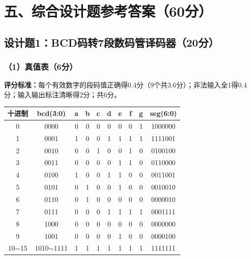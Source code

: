 \newpage

\section{五、综合设计题参考答案（60分）}

\subsection{设计题1：BCD码转7段数码管译码器（20分）}

\subsubsection{（1）真值表（6分）}

\begin{framed}
\textbf{评分标准：}每个有效数字的段码值正确得0.4分（9个共3.6分）；非法输入全1得0.4分；输入输出标注清晰得2分；共6分。
\end{framed}

\vspace{0.3cm}
\begin{center}
\begin{tabular}{|c|c|c|c|c|c|c|c|c|c|}
\hline
\textbf{十进制} & \textbf{bcd(3:0)} & \textbf{a} & \textbf{b} & \textbf{c} & \textbf{d} & \textbf{e} & \textbf{f} & \textbf{g} & \textbf{seg(6:0)} \\
\hline
0 & 0000 & 0 & 0 & 0 & 0 & 0 & 0 & 1 & 1000000 \\
1 & 0001 & 1 & 0 & 0 & 1 & 1 & 1 & 1 & 1111001 \\
2 & 0010 & 0 & 0 & 1 & 0 & 0 & 1 & 0 & 0100100 \\
3 & 0011 & 0 & 0 & 0 & 0 & 1 & 1 & 0 & 0110000 \\
4 & 0100 & 1 & 0 & 0 & 1 & 1 & 0 & 0 & 0011001 \\
5 & 0101 & 0 & 1 & 0 & 0 & 1 & 0 & 0 & 0010010 \\
6 & 0110 & 0 & 1 & 0 & 0 & 0 & 0 & 0 & 0000010 \\
7 & 0111 & 0 & 0 & 0 & 1 & 1 & 1 & 1 & 0001111 \\
8 & 1000 & 0 & 0 & 0 & 0 & 0 & 0 & 0 & 0000000 \\
9 & 1001 & 0 & 0 & 0 & 0 & 1 & 0 & 0 & 0000100 \\
10$\sim$15 & 1010$\sim$1111 & 1 & 1 & 1 & 1 & 1 & 1 & 1 & 1111111 \\
\hline
\end{tabular}
\end{center}

